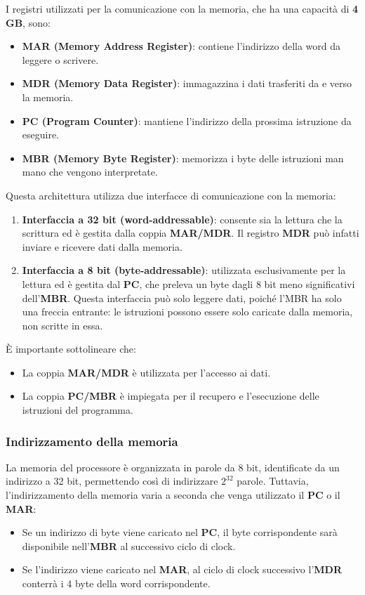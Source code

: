 I registri utilizzati per la comunicazione con la memoria, che ha una capacità di \textbf{4 GB}, sono:
\begin{itemize}
    \item \textbf{MAR (Memory Address Register)}: contiene l'indirizzo della word da leggere o scrivere.
    \item \textbf{MDR (Memory Data Register)}: immagazzina i dati trasferiti da e verso la memoria.
    \item \textbf{PC (Program Counter)}: mantiene l'indirizzo della prossima istruzione da eseguire.
    \item \textbf{MBR (Memory Byte Register)}: memorizza i byte delle istruzioni man mano che vengono interpretate.
\end{itemize}

Questa architettura utilizza due interfacce di comunicazione con la memoria:
\begin{enumerate}
    \item \textbf{Interfaccia a 32 bit (word-addressable)}: consente sia la lettura che la scrittura ed è gestita dalla coppia \textbf{MAR/MDR}. Il registro \textbf{MDR} può infatti inviare e ricevere dati dalla memoria.
    \item \textbf{Interfaccia a 8 bit (byte-addressable)}: utilizzata esclusivamente per la lettura ed è gestita dal \textbf{PC}, che preleva un byte dagli 8 bit meno significativi dell'\textbf{MBR}. Questa interfaccia può solo leggere dati, poiché l'MBR ha solo una freccia entrante: le istruzioni possono essere solo caricate dalla memoria, non scritte in essa.
\end{enumerate}

È importante sottolineare che:
\begin{itemize}
    \item La coppia \textbf{MAR/MDR} è utilizzata per l'accesso ai dati.
    \item La coppia \textbf{PC/MBR} è impiegata per il recupero e l'esecuzione delle istruzioni del programma.
\end{itemize}

\subsubsection*{Indirizzamento della memoria}

La memoria del processore è organizzata in parole da 8 bit, identificate da un indirizzo a 32 bit, permettendo così di indirizzare $2^{32}$ parole. Tuttavia, l'indirizzamento della memoria varia a seconda che venga utilizzato il \textbf{PC} o il \textbf{MAR}:
\begin{itemize}
    \item Se un indirizzo di byte viene caricato nel \textbf{PC}, il byte corrispondente sarà disponibile nell'\textbf{MBR} al successivo ciclo di clock.
    \item Se l'indirizzo viene caricato nel \textbf{MAR}, al ciclo di clock successivo l'\textbf{MDR} conterrà i 4 byte della word corrispondente.
\end{itemize}

